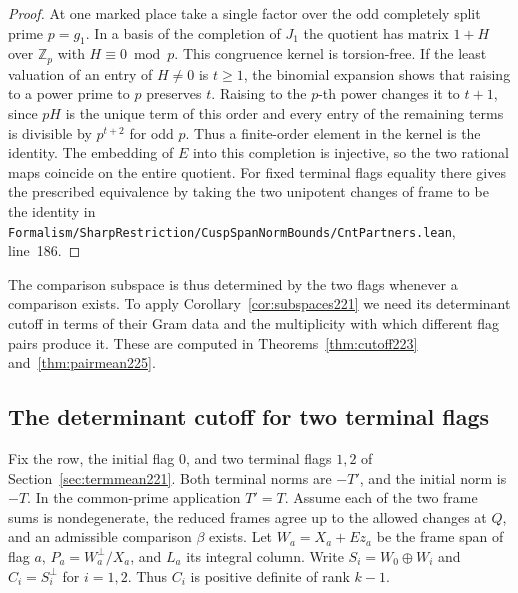 \documentclass[a4paper,11pt]{article}
\theoremstyle{definition}
\theoremstyle{remark}
\newcommand{\ZZ}{\mathbb Z}\newcommand{\ord}{\operatorname{ord}}
\newcommand{\srcloc}[2]{{\small\nolinkurl{#1.lean}}, line~#2}
\numberwithin{equation}{section}
\begin{document}
\begin{proof}
At one marked place take a single factor over the odd
completely split prime \(p=g_1\). In a basis of the completion
of \(J_1\) the quotient has matrix \(1+H\) over \(\ZZ_p\)
with \(H\equiv0\bmod p\). This congruence kernel is
torsion-free. If the least valuation of an entry of
\(H\ne0\) is \(t\ge1\), the binomial expansion shows that
raising to a power prime to \(p\) preserves \(t\). Raising
to the \(p\)-th power changes it to \(t+1\), since \(pH\)
is the unique term of this order and every entry of the
remaining terms is divisible by \(p^{t+2}\) for odd \(p\).
Thus a finite-order element in the kernel is the identity.
The embedding of \(E\) into this completion is injective,
so the two rational maps coincide on the entire quotient.
For fixed terminal flags equality there gives the prescribed
equivalence by taking the two unipotent changes of frame to
be the identity in
\srcloc{Formalism/SharpRestriction/CuspSpanNormBounds/CntPartners}{186}.
\end{proof}

The comparison subspace is thus determined by the two flags whenever a comparison exists. To apply Corollary~\ref{cor:subspaces221} we need its determinant cutoff in terms of their Gram data and the multiplicity with which different flag pairs produce it. These are computed in Theorems~\ref{thm:cutoff223} and~\ref{thm:pairmean225}.

\subsection{The determinant cutoff for two terminal flags}\label{nav:IX-13}
\label{sec:cutoff223}

Fix the row, the initial flag \(0\), and two terminal flags
\(1,2\) of Section~\ref{sec:termmean221}. Both terminal norms
are \(-T'\), and the initial norm is \(-T\). In the common-prime
application \(T'=T\). Assume each of the two frame sums is
nondegenerate, the reduced frames agree up to the allowed
changes at \(Q\), and an admissible comparison \(\beta\) exists.
Let \(W_a=X_a+Ez_a\) be the frame span of flag \(a\),
\(P_a=W_a^\perp/X_a\), and \(L_a\) its integral column.
Write \(S_i=W_0\oplus W_i\) and \(C_i=S_i^\perp\) for \(i=1,2\).
Thus \(C_i\) is positive definite of rank \(k-1\).
\end{document}
